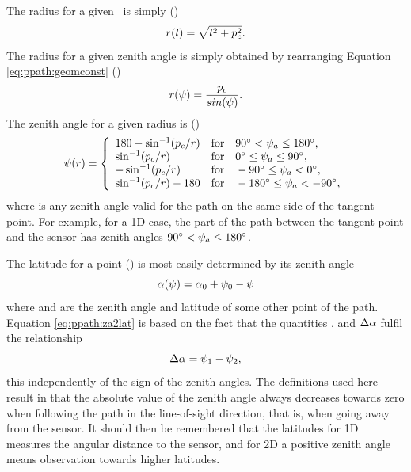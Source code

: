 The radius for a given \PpathLng\ is simply ()
\begin{equation}
  r(l) = \sqrt{l^2+p_c^2}.
  \label{eq:ppath:l2r}
\end{equation}
The radius for a given zenith angle is simply obtained by rearranging 
Equation \ref{eq:ppath:geomconst} ()
\begin{equation}
  r(\psi) = \frac{p_c}{sin(\psi)}.
  \label{eq:ppath:za2r}
\end{equation}
The zenith angle for a given radius is ()
\begin{equation}
  \psi(r) = \left\{
   \begin{array}{ll}
    180 - \sin^{-1}(p_c/r) & 
                   \textrm{for}\quad 90^\circ < \psi_{a} \leq 180^\circ,\\
    \sin^{-1}(p_c/r) & 
                   \textrm{for}\quad 0^\circ \leq \psi_{a} \leq 90^\circ,\\
    -\sin^{-1}(p_c/r) & 
                   \textrm{for}\quad -90^\circ \leq \psi_{a} < 0^\circ,\\
    \sin^{-1}(p_c/r) - 180 & 
                  \textrm{for}\quad -180^\circ \leq \psi_{a} < -90^\circ,\\
   \end{array}   \right.
  \label{eq:ppath:r2psi}
\end{equation}
where  is any zenith angle valid for the path on the same
side of the tangent point. For example, for a 1D case, the part of the
path between the tangent point and the sensor has zenith angles
$90^\circ < \psi_{a} \leq 180^\circ$.

The latitude for a point () is most 
easily determined by its zenith angle \\

\begin{equation}
  \alpha(\psi) = \alpha_{0} + \psi_{0} - \psi
  \label{eq:ppath:za2lat}
\end{equation}
where  and  are the zenith angle and latitude of some 
other point of the path. Equation \ref{eq:ppath:za2lat} is based on the 
fact that the quantities ,  and $\Delta\alpha$
fulfil the relationship
\begin{equation}
  \Delta\alpha = \psi_{1} - \psi_{2},
  \label{eq:ppath:dlat}
\end{equation}
this independently of the sign of the zenith angles. The definitions
used here result in that the absolute value of the zenith angle always
decreases towards zero when following the path in the line-of-sight
direction, that is, when going away from the sensor. It should then be
remembered that the latitudes for 1D measures the angular distance to
the sensor, and for 2D a positive zenith angle means observation
towards higher latitudes.

